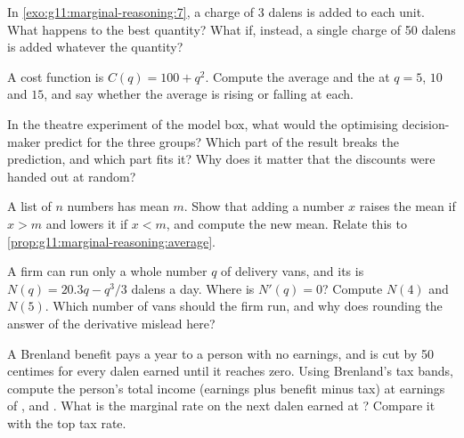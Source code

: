 \begin{exercise}[$\star\star$]\label{exo:g11:marginal-reasoning:10}
In \cref{exo:g11:marginal-reasoning:7}, a charge of 3 dalens is added to each unit. What happens to the best quantity? What if, instead, a single charge of 50
dalens is added whatever the quantity?
\end{exercise}

\begin{exercise}[$\star\star$]\label{exo:g11:marginal-reasoning:11}
A cost function is $C(q) = 100 + q^2$. Compute the average and the  at $q = 5$, $10$ and $15$, and say whether the average is rising or falling at each.
\end{exercise}

\begin{exercise}[$\star\star\star$]\label{exo:g11:marginal-reasoning:12}
In the theatre experiment of the model box, what would the optimising decision-maker predict for the three groups? Which part of the result breaks the prediction,
and which part fits it? Why does it matter that the discounts were handed out at random?
\end{exercise}

\begin{exercise}[$\star\star\star$]\label{exo:g11:marginal-reasoning:13}
A list of $n$ numbers has mean $m$. Show that adding a number $x$ raises the mean if $x > m$ and lowers it if $x < m$, and compute the new mean. Relate this to
\cref{prop:g11:marginal-reasoning:average}.
\end{exercise}

\begin{exercise}[$\star\star\star$]\label{exo:g11:marginal-reasoning:14}
A firm can run only a whole number $q$ of delivery vans, and its  is $N(q) = 20.3q - q^3/3$ dalens a day. Where is $N'(q) = 0$? Compute $N(4)$ and
$N(5)$. Which number of vans should the firm run, and why does rounding the answer of the derivative mislead here?
\end{exercise}

\begin{exercise}[$\star\star\star$]\label{exo:g11:marginal-reasoning:15}
A Brenland benefit pays  a year to a person with no earnings, and is cut by 50 centimes for every dalen earned until it reaches zero. Using Brenland's
tax bands, compute the person's total income (earnings plus benefit minus tax) at earnings of ,  and . What is the marginal rate on the
next dalen earned at ? Compare it with the top tax rate.
\end{exercise}

